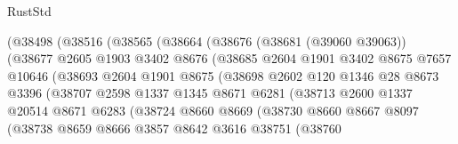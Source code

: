\begin{lexlean}{RustStd}
\begin{coremodule}
                      (@38498
                        (@38516
                          (@38565
                            (@38664
                              (@38676
                                (@38681 (@39060 @39063))
                                (@38677
                                  @2605
                                  @1903
                                  @3402
                                  @8676
                                  (@38685
                                    @2604
                                    @1901
                                    @3402
                                    @8675
                                    @7657
                                    @10646
                                    (@38693
                                      @2604
                                      @1901
                                      @8675
                                      (@38698
                                        @2602
                                        @120
                                        @1346
                                        @28
                                        @8673
                                        @3396
                                        (@38707
                                          @2598
                                          @1337
                                          @1345
                                          @8671
                                          @6281
                                          (@38713
                                            @2600
                                            @1337
                                            @20514
                                            @8671
                                            @6283
                                            (@38724
                                              @8660
                                              @8669
                                              (@38730
                                                @8660
                                                @8667
                                                @8097
                                                (@38738
                                                  @8659
                                                  @8666
                                                  @3857
                                                  @8642
                                                  @3616
                                                  @38751
                                                  (@38760

\end{coremodule}
\end{lexlean}
